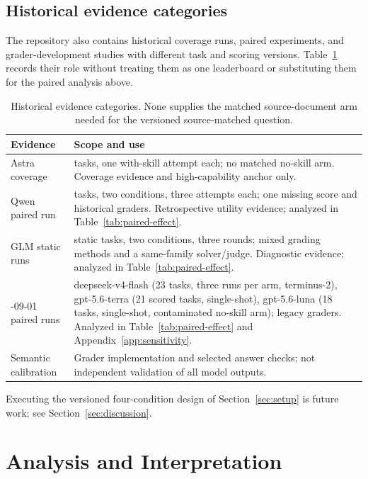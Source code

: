 \documentclass[11pt]{article}
\begin{document}
\subsection{Historical evidence categories}
\label{sec:evidence}

The repository also contains historical coverage runs, paired experiments, and grader-development studies with different task and scoring versions.
Table~\ref{tab:evidence} records their role without treating them as one leaderboard or substituting them for the paired analysis above.

\begin{table}[t]
\centering
\small
\begin{tabular}{>{\raggedright\arraybackslash}p{}>{\raggedright\arraybackslash}p{}}
\hline
Evidence & Scope and use\\
\hline
Astra coverage & 56 tasks, one with-skill attempt each; no matched no-skill arm. Coverage evidence and high-capability anchor only.\\
Qwen paired run & 56 tasks, two conditions, three attempts each; one missing score and historical graders. Retrospective utility evidence; analyzed in Table~\ref{tab:paired-effect}.\\
GLM static runs & 22 static tasks, two conditions, three rounds; mixed grading methods and a same-family solver/judge. Diagnostic evidence; analyzed in Table~\ref{tab:paired-effect}.\\
2026-09-01 paired runs & deepseek-v4-flash (23 tasks, three runs per arm, terminus-2), gpt-5.6-terra (21 scored tasks, single-shot), gpt-5.6-luna (18 tasks, single-shot, contaminated no-skill arm); legacy graders. Analyzed in Table~\ref{tab:paired-effect} and Appendix~\ref{app:sensitivity}.\\
Semantic calibration & Grader implementation and selected answer checks; not independent validation of all model outputs.\\
\hline
\end{tabular}
\caption{Historical evidence categories. None supplies the matched source-document arm needed for the versioned source-matched question.}
\label{tab:evidence}
\end{table}

Executing the versioned four-condition design of Section~\ref{sec:setup} is future work; see Section~\ref{sec:discussion}.

\section{Analysis and Interpretation}
\label{sec:analysis}
\end{document}
